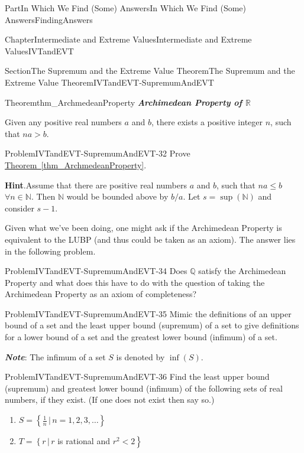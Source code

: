 \documentclass[oneside,10pt,]{book}
\newcommand{\blocktitlefont}{\relax}
\newcommand{\xreffont}{\relax}
\newcommand{\alert}[1]{\textbf{\textit{#1}}}
\numberwithin{equation}{part}
\newcommand{\RR}{\mathbb {R}}
\newcommand{\QQ}{\mathbb {Q}}
\newcommand{\NN}{\mathbb {N}}
\newcommand{\lt}{<}
\begin{document}
\begin{partptx}{Part}{In Which We Find (Some) Answers}{}{In Which We Find (Some) Answers}{}{}{FindingAnswers}
\begin{chapterptx}{Chapter}{Intermediate and Extreme Values}{}{Intermediate and Extreme Values}{}{}{IVTandEVT}
\begin{sectionptx}{Section}{The Supremum and the Extreme Value Theorem}{}{The Supremum and the Extreme Value Theorem}{}{}{IVTandEVT-SupremumAndEVT}
\begin{theorem}{Theorem}{}{}{thm_ArchmedeanProperty}%
%
\alert{Archimedean Property of \(\RR\)}%
\par
Given any positive real numbers \(a\) and \(b\), there exists a positive integer \(n\), such that \(na>b\).%
\end{theorem}
\begin{problem}{Problem}{}{IVTandEVT-SupremumAndEVT-32}%
Prove \hyperref[thm_ArchmedeanProperty]{Theorem~{\xreffont\ref{thm_ArchmedeanProperty}}}.%
\par\smallskip%
\noindent\textbf{\blocktitlefont Hint}.\hypertarget{IVTandEVT-SupremumAndEVT-32-4}{}\quad{}Assume that there are positive real numbers \(a\) and \(b\), such that \(na\le b\) \(\forall n\in \NN\). Then \(\NN\) would be bounded above by \(b/a\). Let \(s=\sup(\NN)\) and consider \(s-1\).%
\end{problem}
Given what we've been doing, one might ask if the Archimedean Property is equivalent to the LUBP (and thus could be taken as an axiom). The answer lies in the following problem.%
\begin{problem}{Problem}{}{IVTandEVT-SupremumAndEVT-34}%
\index{Archimedean Property!and \(\QQ\)}  Does \(\QQ\) satisfy the Archimedean Property and what does this have to do with the question of taking the Archimedean Property as an axiom of completeness?%
\end{problem}
\begin{problem}{Problem}{}{IVTandEVT-SupremumAndEVT-35}%
 Mimic the definitions of an upper bound of a set and the least upper bound (supremum) of a set to give definitions for a lower bound of a set and the greatest lower bound (infimum) of a set.%
\par
\alert{Note}: The infimum of a set \(S\) is denoted by \(\inf(S)\).%
\end{problem}
\begin{problem}{Problem}{}{IVTandEVT-SupremumAndEVT-36}%
 Find the least upper bound (supremum) and greatest lower bound (infimum) of the following sets of real numbers, if they exist. (If one does not exist then say so.)%
\begin{enumerate}[label={(\alph*)}]
\item{}\(\displaystyle S=\left\{\frac{1}{n}\,|\,n=1,2,3,\ldots\right\}\)%
\item{}\(T=\left\{r\,|\,r\right.\) is rational and \(\left.r^2\lt 2\right\}\)%

\end{enumerate}
\end{problem}
\end{sectionptx}
\end{chapterptx}
\end{partptx}
\end{document}
